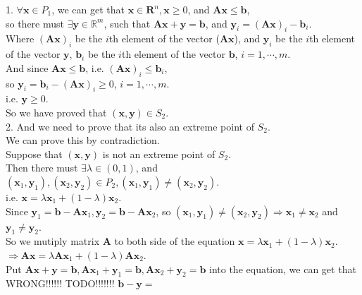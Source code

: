 \documentclass[10pt]{article}
\renewcommand{\mathbf}{\boldsymbol}
\begin{document}
1. $\forall\mathbf{x}\in P_1$, we can get that $\mathbf{x}\in\mathbf{R}^n,\mathbf{x}\geq 0$, and $\mathbf{Ax}\leq\mathbf{b}$,\\
so there must $\exists \mathbf{y}\in \mathbb{R}^m$, such that $\mathbf{Ax}+\mathbf{y}=\mathbf{b}$, and $\mathbf{y}_i=(\mathbf{Ax})_i-\mathbf{b}_i$.\\
Where $(\mathbf{Ax})_i$ be the $i$th element of the vector ($\mathbf{Ax}$), and $\mathbf{y}_i$ be the $i$th element of the vector $\mathbf{y}$, $\mathbf{b}_i$ be the $i$th element of the vector $\mathbf{b}$, $i=1,\cdots,m$.\\
And since $\mathbf{Ax}\leq \mathbf{b}$, i.e. $(\mathbf{Ax})_i\leq\mathbf{b}_i$,\\
so $\mathbf{y}_i=\mathbf{b}_i-(\mathbf{Ax})_i\geq 0$, $i=1,\cdots,m$.\\
i.e. $\mathbf{y}\geq 0$.\\
So we have proved that $(\mathbf{x},\mathbf{y})\in S_2$.\\

2. And we need to prove that its also an extreme point of $S_2$.\\
We can prove this by contradiction.\\
Suppose that $(\mathbf{x},\mathbf{y})$ is not an extreme point of $S_2$.\\
Then there must $\exists\lambda\in(0,1)$, and $(\mathbf{x}_1,\mathbf{y}_1),(\mathbf{x}_2,\mathbf{y}_2)\in P_2, (\mathbf{x}_1,\mathbf{y}_1)\neq(\mathbf{x}_2,\mathbf{y}_2)$.\\
i.e. $\mathbf{x}=\lambda\mathbf{x}_1+(1-\lambda)\mathbf{x}_2$.\\

Since $\mathbf{y}_1=\mathbf{b}-\mathbf{Ax}_1, \mathbf{y}_2=\mathbf{b}-\mathbf{Ax}_2$,
so $(\mathbf{x}_1,\mathbf{y}_1)\neq(\mathbf{x}_2,\mathbf{y}_2)\Rightarrow\mathbf{x}_1\neq \mathbf{x}_2$ and $\mathbf{y}_1\neq \mathbf{y}_2$.\\
So we mutiply matrix $\mathbf{A}$ to both side of the equation $\mathbf{x}=\lambda\mathbf{x}_1+(1-\lambda)\mathbf{x}_2$.\\
$\Rightarrow \mathbf{A}\mathbf{x}=\lambda\mathbf{A}\mathbf{x}_1+(1-\lambda)\mathbf{A}\mathbf{x}_2$.\\
Put $\mathbf{Ax}+\mathbf{y}=\mathbf{b}, \mathbf{Ax}_1+\mathbf{y}_1=\mathbf{b}, \mathbf{Ax}_2+\mathbf{y}_2=\mathbf{b}$ into the equation, we can get that\\

WRONG!!!!!!
TODO!!!!!!!
$\mathbf{b}-\mathbf{y}=$
\end{document}
